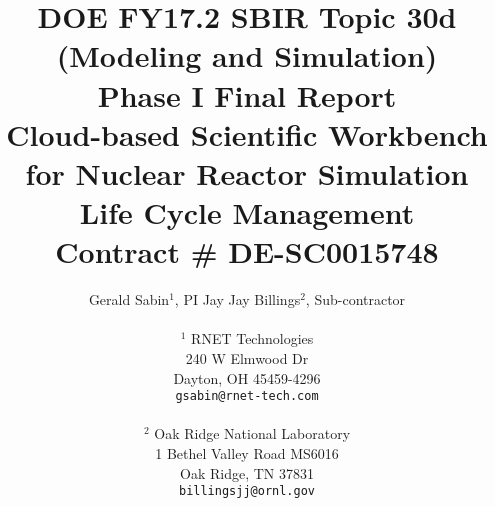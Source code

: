 \title{DOE FY17.2 SBIR Topic 30d (Modeling and Simulation)\\
\vspace{0.25in}Phase I Final Report\\
\vspace{0.1in}Cloud-based Scientific Workbench for Nuclear Reactor Simulation 
Life Cycle Management\\
\vspace{0.1in}Contract \# DE-SC0015748
\vspace{0.5in}}
\author{Gerald Sabin$^1$, PI \hspace{0.75in} Jay Jay Billings$^2$, 
Sub-contractor\\
  \\$^1$ RNET Technologies\\
  240 W Elmwood Dr\\
  Dayton, OH 45459-4296\\
  {\tt gsabin@rnet-tech.com}\\\\
  $^2$ Oak Ridge National Laboratory\\
  1 Bethel Valley Road MS6016\\
  Oak Ridge, TN 37831\\
  {\tt billingsjj@ornl.gov}
}
